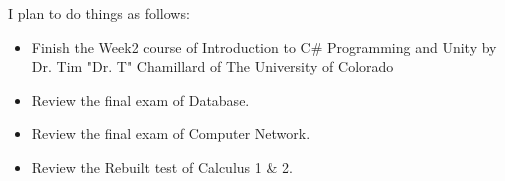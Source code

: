 \documentclass[a4paper]{report}
\begin{document}
\noindent
\qquad I plan to do things as follows:

\begin{itemize}

\item Finish the Week2 course of Introduction to C\# Programming and Unity by  Dr. Tim "Dr. T" Chamillard of The University of Colorado

\item Review the final exam of Database.
\item Review the final exam of Computer Network.
\item Review the Rebuilt test of Calculus 1 \& 2.

\end{itemize}

%
%




\end{document}
